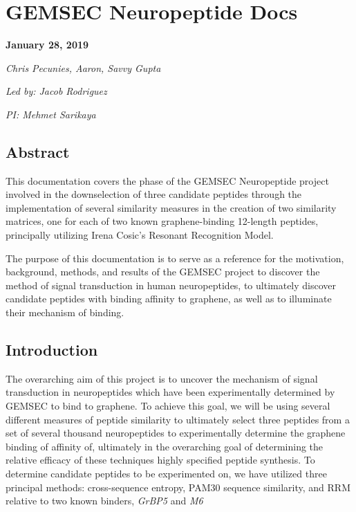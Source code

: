 \documentclass[]{article}
\date{}
\begin{document}
\hypertarget{gemsec-neuropeptide-docs}{%
\section{GEMSEC Neuropeptide Docs}\label{gemsec-neuropeptide-docs}}

\textbf{January 28, 2019}

\emph{Chris Pecunies, Aaron, Savvy Gupta}

\emph{Led by: Jacob Rodriguez}

\emph{PI: Mehmet Sarikaya}

\hypertarget{abstract}{%
\subsection{Abstract}\label{abstract}}

This documentation covers the phase of the GEMSEC Neuropeptide project involved in the downselection of three candidate peptides through the implementation of several similarity measures in the creation of two similarity matrices, one for each of two known graphene-binding 12-length peptides, principally utilizing Irena Cosic's Resonant Recognition Model.

The purpose of this documentation is to serve as a reference for the motivation, background, methods, and results of the GEMSEC project to discover the method of signal transduction in human neuropeptides, to ultimately discover candidate peptides with binding affinity to graphene, as well as to illuminate their mechanism of binding.

\hypertarget{introduction}{%
\subsection{Introduction}\label{introduction}}

The overarching aim of this project is to uncover the mechanism of signal transduction in neuropeptides which have been experimentally determined by GEMSEC to bind to graphene. To achieve this goal, we will be using several different measures of peptide similarity to ultimately select three peptides from a set of several thousand neuropeptides to experimentally determine the graphene binding of affinity of, ultimately in the overarching goal of determining the relative efficacy of these techniques highly specified peptide synthesis. To determine candidate peptides to be experimented on, we have utilized three principal methods: cross-sequence entropy, PAM30 sequence similarity, and RRM relative to two known binders, \emph{GrBP5} and \emph{M6}
\end{document}
